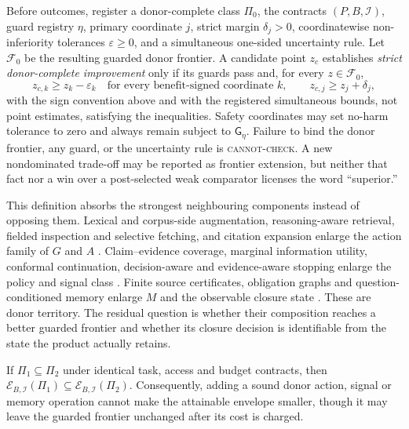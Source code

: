 \begin{definition}
\label{def:strict-envelope-improvement}
Before outcomes, register a donor-complete class $\Pi_0$, the contracts
$(P,B,\mathcal I)$, guard registry $\eta$, primary coordinate $j$, strict
margin $\delta_j>0$, coordinatewise non-inferiority tolerances
$\varepsilon\geq0$, and a simultaneous one-sided uncertainty rule. Let
$\mathcal F_0$ be the resulting guarded donor frontier. A candidate point
$z_c$ establishes \emph{strict donor-complete improvement} only if its guards
pass and, for every $z\in\mathcal F_0$,
\[
 z_{c,k}\geq z_k-\varepsilon_k\quad\text{for every benefit-signed coordinate }k,
 \qquad z_{c,j}\geq z_j+\delta_j,
\]
with the sign convention above and with the registered simultaneous bounds,
not point estimates, satisfying the inequalities. Safety coordinates may set
no-harm tolerance to zero and always remain subject to $\mathsf G_\eta$.
Failure to bind the donor frontier, any guard, or the uncertainty rule is
\textsc{cannot-check}. A new nondominated trade-off may be reported as frontier
extension, but neither that fact nor a win over a post-selected weak comparator
licenses the word ``superior.''
\end{definition}

This definition absorbs the strongest neighbouring components instead of
opposing them.  Lexical and corpus-side augmentation, reasoning-aware retrieval,
fielded inspection and selective fetching, and citation expansion enlarge the
action family of $G$ and $A$ \cite{sage2026,agentir2026,sieve2026,rethinkinglitsearch2026}.
Claim--evidence coverage, marginal information utility, conformal continuation,
decision-aware and evidence-aware stopping enlarge the policy and signal class
\cite{halt2026,deepcontrol2026,micp2026,decisionstop2026,donotstopearly2026,confidencebasedstop2026}.
Finite source certificates, obligation graphs and question-conditioned memory
enlarge $M$ and the observable closure state
\cite{knowplan2026,icore2026,memchain2026,scienceintent2026}.  These are donor
territory.  The residual question is whether their composition reaches a better
guarded frontier and whether its closure decision is identifiable from the
state the product actually retains.

\begin{proposition}
\label{prop:donor-monotonicity}
If $\Pi_1\subseteq\Pi_2$ under identical task, access and budget contracts, then
$\mathcal E_{B,\mathcal I}(\Pi_1)\subseteq
\mathcal E_{B,\mathcal I}(\Pi_2)$.  Consequently, adding a sound donor action,
signal or memory operation cannot make the attainable envelope smaller, though
it may leave the guarded frontier unchanged after its cost is charged.
\end{proposition}

